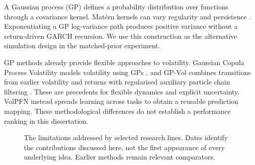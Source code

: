 A Gaussian process (GP) defines a probability distribution over functions through a covariance kernel. Mat\'ern kernels can vary regularity and persistence \citep{rasmussen2006gaussian}. Exponentiating a GP log-variance path produces positive variance without a return-driven GARCH recursion. We use this construction as the alternative simulation design in the matched-prior experiment.

GP methods already provide flexible approaches to volatility. Gaussian Copula Process Volatility models volatility using GPs \citep{wilson2010copula}, and GP-Vol combines transitions from earlier volatility and returns with regularised auxiliary particle chain filtering \citep{wu2014gaussian}. These are precedents for flexible dynamics and explicit uncertainty. VolPFN instead spreads learning across tasks to obtain a reusable prediction mapping. These methodological differences do not establish a performance ranking in this dissertation.

\begin{figure}[!htbp]
\centering
{}
\caption[Selected developments leading to VolPFN]{The limitations addressed by selected research lines. Dates identify the contributions discussed here, not the first appearance of every underlying idea. Earlier methods remain relevant comparators.}
\label{fig:background-timeline}
\end{figure}

